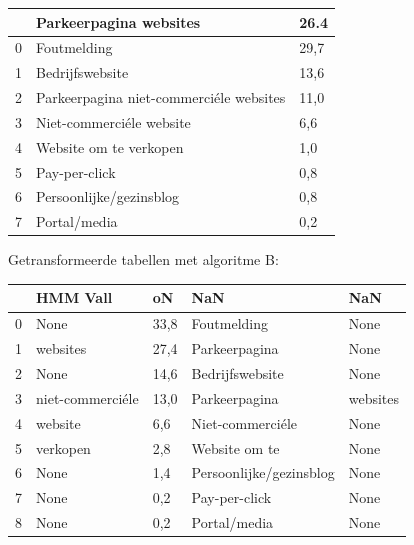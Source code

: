 \begin{tabular}{lll}
\toprule
{} &                   Parkeerpagina websites &  26.4 \\
\midrule
0 &                              Foutmelding &  29,7 \\
1 &                          Bedrijfswebsite &  13,6 \\
2 &  Parkeerpagina niet-commerciéle websites &  11,0 \\
3 &                 Niet-commerciéle website &   6,6 \\
4 &                   Website om te verkopen &   1,0 \\
5 &                            Pay-per-click &   0,8 \\
6 &                  Persoonlijke/gezinsblog &   0,8 \\
7 &                             Portal/media &   0,2 \\
\bottomrule
\end{tabular}

Getransformeerde tabellen met algoritme B:

\begin{tabular}{lllll}
\toprule
{} &          HMM Vall &    oN &                      NaN &       NaN \\
\midrule
0 &              None &  33,8 &              Foutmelding &      None \\
1 &          websites &  27,4 &            Parkeerpagina &      None \\
2 &              None &  14,6 &          Bedrijfswebsite &      None \\
3 &  niet-commerciéle &  13,0 &            Parkeerpagina &  websites \\
4 &           website &   6,6 &         Niet-commerciéle &      None \\
5 &          verkopen &   2,8 &            Website om te &      None \\
6 &              None &   1,4 &  Persoonlijke/gezinsblog &      None \\
7 &              None &   0,2 &            Pay-per-click &      None \\
8 &              None &   0,2 &             Portal/media &      None \\
\bottomrule
\end{tabular}


